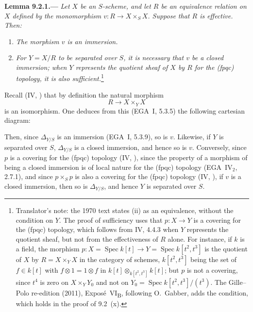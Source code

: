 
\medskip
{}\label{lem:sga3-VIB-9.2.1}%
\noindent\textbf{Lemma 9.2.1.---}
\emph{Let \(X\) be an \(S\)-scheme, and let \(R\) be an
equivalence relation on \(X\) defined by the monomorphism
\(v:R\to X\times_S X\). Suppose that \(R\) is effective.
Then:}
\begin{enumerate}
\item[\textup{(i)}]\label{concl:sga3-VIB-9.2.1-i}
  \emph{The morphism \(v\) is an immersion.}

\item[\textup{(ii)}]\label{concl:sga3-VIB-9.2.1-ii}
  \emph{For \(Y=X/R\) to be separated over \(S\), it is necessary
  that \(v\) be a closed immersion; when \(Y\) represents the
  quotient sheaf of \(X\) by \(R\) for the \textup{(fpqc)}
  topology, it is also sufficient.}\footnote{Translator's note: the 1970 text states \textup{(ii)} as an
  equivalence, without the condition on \(Y\). The proof of sufficiency uses that \(p\colon X\to Y\) is a
  covering for the \textup{(fpqc)} topology, which follows from IV, 4.4.3 when \(Y\) represents the quotient
  sheaf, but not from the effectiveness of \(R\) alone. For instance, if \(k\) is a field, the morphism
  \(p\colon X=\operatorname{Spec}k[t]\to Y=\operatorname{Spec}k[t^2,t^3]\) is the quotient of \(X\) by
  \(R=X\times_YX\) in the category of schemes, \(k[t^2,t^3]\) being the set of \(f\in k[t]\) with
  \(f\otimes1=1\otimes f\) in \(k[t]\otimes_{k[t^2,t^3]}k[t]\); but \(p\) is not a covering, since \(t^4\) is
  zero on \(X\times_YY_0\) and not on \(Y_0=\operatorname{Spec}k[t^2,t^3]/(t^3)\). The Gille--Polo re-edition
  (2011), Expos\'e~VI\textsubscript{B}, following O.~Gabber, adds the condition, which holds in the proof of
  9.2~\textup{(x)}.}
\end{enumerate}

Recall (IV, ) that by definition the natural morphism
\[
  R\longrightarrow X\times_Y X
\]
is an isomorphism. One deduces from this (EGA~I, 5.3.5) the
following cartesian diagram:
\begin{center}
  \label{diag:sga3-VIB-9.2.1-effective-square}%
\end{center}
Then, since \(\Delta_{Y/S}\) is an immersion (EGA~I, 5.3.9), so
is \(v\). Likewise, if \(Y\) is separated over \(S\),
\(\Delta_{Y/S}\) is a closed immersion, and hence so is \(v\).
Conversely, since \(p\) is a covering for the \textup{(fpqc)}
topology (IV, ), since the property of a morphism of
being a closed immersion is of local nature for the
\textup{(fpqc)} topology (EGA~IV\(_2\), 2.7.1), and since
\(p\times_Sp\) is also a covering for the \textup{(fpqc)}
topology (IV, ), if \(v\) is a closed immersion, then so is
\(\Delta_{Y/S}\), and hence \(Y\) is separated over \(S\).

